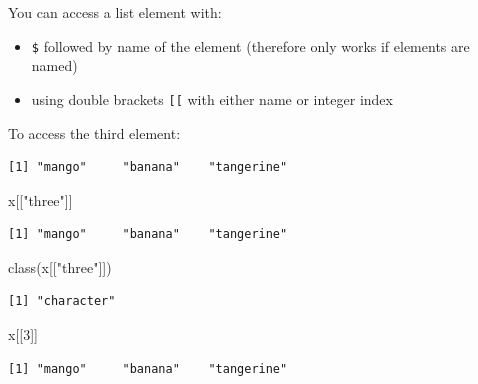 \documentclass[
]{book}
\newenvironment{Shaded}{\begin{snugshade}}{\end{snugshade}}
\newcommand{\DecValTok}[1]{\textcolor[rgb]{0.00,0.00,0.81}{#1}}
\newcommand{\FunctionTok}[1]{\textcolor[rgb]{0.00,0.00,0.00}{#1}}
\newcommand{\NormalTok}[1]{#1}
\newcommand{\SpecialCharTok}[1]{\textcolor[rgb]{0.00,0.00,0.00}{#1}}
\newcommand{\StringTok}[1]{\textcolor[rgb]{0.31,0.60,0.02}{#1}}
\providecommand{\tightlist}{%
  \setlength{\itemsep}{0pt}\setlength{\parskip}{0pt}}
\begin{document}
You can access a list element with:

\begin{itemize}
\tightlist
\item
  \texttt{\$} followed by name of the element (therefore only works if elements are named)
\item
  using double brackets \texttt{{[}{[}} with either name or integer index
\end{itemize}

To access the third element:

\begin{Shaded}
\end{Shaded}

\begin{verbatim}
[1] "mango"     "banana"    "tangerine"
\end{verbatim}

\begin{Shaded}
\begin{Highlighting}[]
\NormalTok{x[[}\StringTok{"three"}\NormalTok{]]}
\end{Highlighting}
\end{Shaded}

\begin{verbatim}
[1] "mango"     "banana"    "tangerine"
\end{verbatim}

\begin{Shaded}
\begin{Highlighting}[]
\FunctionTok{class}\NormalTok{(x[[}\StringTok{"three"}\NormalTok{]])}
\end{Highlighting}
\end{Shaded}

\begin{verbatim}
[1] "character"
\end{verbatim}

\begin{Shaded}
\begin{Highlighting}[]
\NormalTok{x[[}\DecValTok{3}\NormalTok{]]}
\end{Highlighting}
\end{Shaded}

\begin{verbatim}
[1] "mango"     "banana"    "tangerine"
\end{verbatim}
\end{document}
